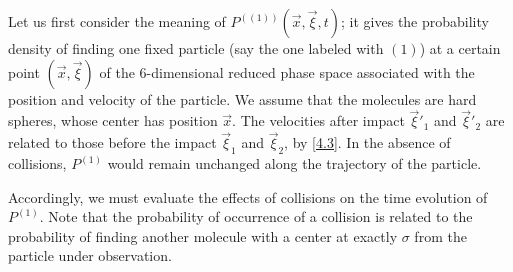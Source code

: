 Let us first consider the meaning of \(P^{((1))}(\vec{x}, \vec{\xi}, t)\); it gives the probability density of finding one fixed particle (say the one labeled with \((1)\)) at a certain point \((\vec{x}, \vec{\xi})\) of the \(6\)-dimensional reduced phase space associated with the position and velocity of the particle. We assume that the molecules are hard spheres, whose center has position \(\vec{x}\). The velocities after impact \(\vec{\xi}'_1\) and \(\vec{\xi}'_2\) are related to those before the impact \(\vec{\xi}_1\) and \(\vec{\xi}_2\), by \eqref{4.3}. In the absence of collisions, \(P^{(1)}\) would remain unchanged along the trajectory of the particle.

Accordingly, we must evaluate the effects of collisions on the time evolution of \(P^{(1)}\). Note that the probability of occurrence of a collision is related to the probability of finding another molecule with a center at exactly \(\sigma\) from the particle under observation. 

